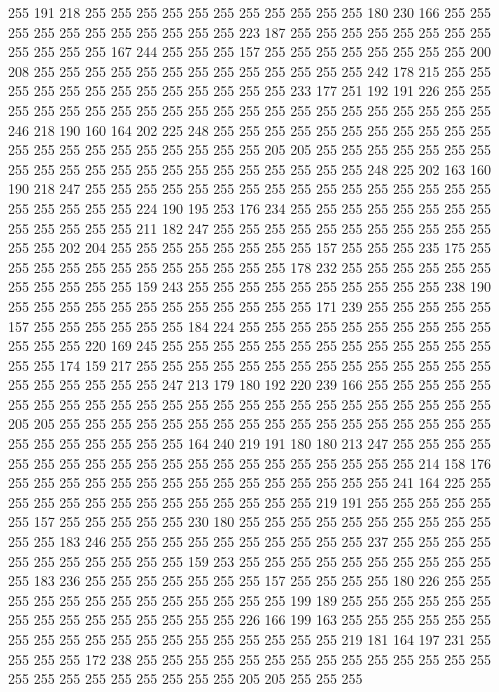 255 191 218 255 255 255 255 255 255 255 255 255 255 255 180 230 166 255 255 255
255 255 255 255 255 255 255 255 223 187 255 255 255 255 255 255 255 255 255 255
255 255 167 244 255 255 255 157 255 255 255 255 255 255 255 255 200 208 255 255
255 255 255 255 255 255 255 255 255 255 255 242 178 215 255 255 255 255 255 255
255 255 255 255 255 255 255 233 177 251 192 191 226 255 255 255 255 255 255 255
255 255 255 255 255 255 255 255 255 255 255 255 255 255 246 218 190 160 164 202
225 248 255 255 255 255 255 255 255 255 255 255 255 255 255 255 255 255 255 255
255 255 255 205 205 255 255 255 255 255 255 255 255 255 255 255 255 255 255 255
255 255 255 255 255 255 248 225 202 163 160 190 218 247 255 255 255 255 255 255
255 255 255 255 255 255 255 255 255 255 255 255 255 255 255 224 190 195 253 176
234 255 255 255 255 255 255 255 255 255 255 255 255 255 211 182 247 255 255 255
255 255 255 255 255 255 255 255 255 255 202 204 255 255 255 255 255 255 255 255
157 255 255 255 235 175 255 255 255 255 255 255 255 255 255 255 255 255 178 232
255 255 255 255 255 255 255 255 255 255 255 159 243 255 255 255 255 255 255 255
255 255 255 238 190 255 255 255 255 255 255 255 255 255 255 255 255 171 239 255
255 255 255 255 157 255 255 255 255 255 255 184 224 255 255 255 255 255 255 255
255 255 255 255 255 255 220 169 245 255 255 255 255 255 255 255 255 255 255 255
255 255 255 255 174 159 217 255 255 255 255 255 255 255 255 255 255 255 255 255
255 255 255 255 255 255 255 247 213 179 180 192 220 239 166 255 255 255 255 255
255 255 255 255 255 255 255 255 255 255 255 255 255 255 255 255 255 255 255 205
205 255 255 255 255 255 255 255 255 255 255 255 255 255 255 255 255 255 255 255
255 255 255 255 255 164 240 219 191 180 180 213 247 255 255 255 255 255 255 255
255 255 255 255 255 255 255 255 255 255 255 255 255 214 158 176 255 255 255 255
255 255 255 255 255 255 255 255 255 255 255 241 164 225 255 255 255 255 255 255
255 255 255 255 255 255 255 219 191 255 255 255 255 255 255 157 255 255 255 255
255 230 180 255 255 255 255 255 255 255 255 255 255 255 255 183 246 255 255 255
255 255 255 255 255 255 255 237 255 255 255 255 255 255 255 255 255 255 255 159
253 255 255 255 255 255 255 255 255 255 255 255 183 236 255 255 255 255 255 255
255 157 255 255 255 255 180 226 255 255 255 255 255 255 255 255 255 255 255 255
255 199 189 255 255 255 255 255 255 255 255 255 255 255 255 255 255 255 226 166
199 163 255 255 255 255 255 255 255 255 255 255 255 255 255 255 255 255 255 255
255 219 181 164 197 231 255 255 255 255 172 238 255 255 255 255 255 255 255 255
255 255 255 255 255 255 255 255 255 255 255 255 255 255 255 205 205 255 255 255
